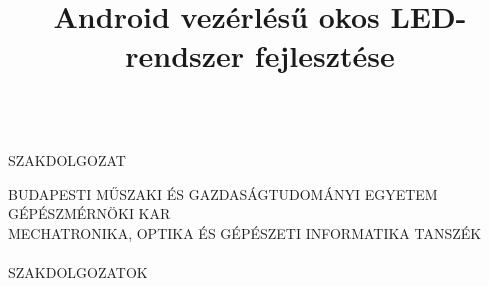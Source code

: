 \documentclass[12pt,a4paper]{article}
\begin{document}
\author{\myname}
\title{Android vezérlésű okos LED-rendszer fejlesztése}

\thispagestyle{empty}
\begin{center}
     \MakeUppercase{\myname}\\
     SZAKDOLGOZAT
\end{center}
\newpage

\thispagestyle{empty}
\begin{center}
     BUDAPESTI MŰSZAKI ÉS GAZDASÁGTUDOMÁNYI EGYETEM\\
     GÉPÉSZMÉRNÖKI KAR\\
     MECHATRONIKA, OPTIKA ÉS GÉPÉSZETI INFORMATIKA TANSZÉK\\[1ex]
     \\[1ex]
     SZAKDOLGOZATOK
\end{center}
\newpage
\end{document}
